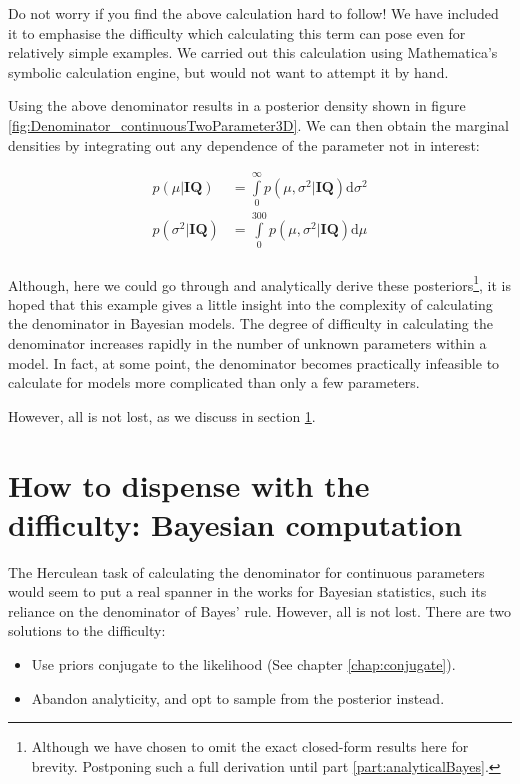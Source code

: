\documentclass[11pt,fullpage]{book}
\begin{document}
Do not worry if you find the above calculation hard to follow! We have included it to emphasise the difficulty which calculating this term can pose even for relatively simple examples. We carried out this calculation using Mathematica's symbolic calculation engine, but would not want to attempt it by hand.

Using the above denominator results in a posterior density shown in figure \ref{fig:Denominator_continuousTwoParameter3D}. We can then obtain the marginal densities by integrating out any dependence of the parameter not in interest:


\begin{align}
p(\mu|\boldsymbol{IQ}) &= \int\limits_{0}^{\infty} p(\mu,\sigma^2|\boldsymbol{IQ}) \mathrm{d}\sigma^2\\
p(\sigma^2|\boldsymbol{IQ}) &= \int\limits_{0}^{300} p(\mu,\sigma^2|\boldsymbol{IQ}) \mathrm{d}\mu\\
\end{align}

Although, here we could go through and analytically derive these posteriors\footnote{Although we have chosen to omit the exact closed-form results here for brevity. Postponing such a full derivation until part \ref{part:analyticalBayes}.}, it is hoped that this example gives a little insight into the complexity of  calculating the denominator in Bayesian models. The degree of difficulty in calculating the denominator increases rapidly in the number of unknown parameters within a model. In fact, at some point, the denominator becomes practically infeasible to calculate for models more complicated than only a few parameters. 

However, all is not lost, as we discuss in section \ref{sec:Denominator_dispensingWithNumerator}.

\section{How to dispense with the difficulty: Bayesian computation}\label{sec:Denominator_dispensingWithNumerator}
The Herculean task of calculating the denominator for continuous parameters would seem to put a real spanner in the works for Bayesian statistics, such its reliance on the denominator of Bayes' rule. However, all is not lost. There are two solutions to the difficulty:

\begin{itemize}
\item Use priors conjugate to the likelihood (See chapter \ref{chap:conjugate}).
\item Abandon analyticity, and opt to sample from the posterior instead.
\end{itemize}
\end{document}
